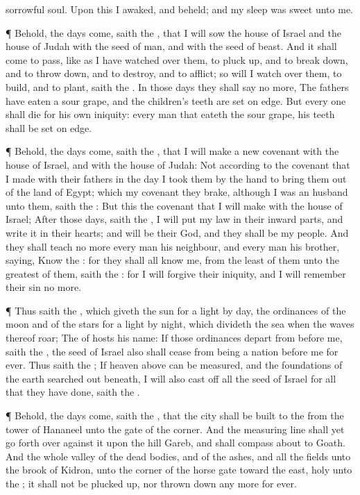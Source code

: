 {sorrowful
soul.
Upon this I
awaked, and
beheld; and my
sleep was
sweet unto me.
\par }{\PP {}¶ Behold, the
days
come,
saith the
{}, that I will
sow the
house of
Israel and the
house of
Judah with the
seed of
man, and with the
seed of
beast.
And it shall come to pass,
{} like as I have watched
over them, to pluck
up, and to break
down, and to throw
down, and to
destroy, and to
afflict; so will I watch
over them, to
build, and to
plant,
saith the
{}.
In those
days they shall
say no more, The
fathers have
eaten a sour
grape, and the
children’s
teeth are set on
edge.
But every
one shall
die for his own
iniquity: every
man that
eateth the sour
grape, his
teeth shall be set on
edge.
\par }{\PP {}¶ Behold, the
days
come,
saith the
{}, that I will
make a
new
covenant with the
house of
Israel, and with the
house of
Judah:
Not according to the
covenant that I
made with their
fathers in the
day
{} I
took them by the
hand to bring them
out of the
land of
Egypt; which my
covenant they
brake, although I was an
husband unto them,
saith the
{}:
But this
{} the
covenant that I will
make with the
house of
Israel;
After those
days,
saith the
{}, I will
put my
law in their inward
parts, and
write it in their
hearts; and will be their
God, and they shall be my
people.
And they shall
teach no more every
man his
neighbour, and every
man his
brother,
saying,
Know the
{}: for they shall all
know me, from the
least of them unto the
greatest of them,
saith the
{}: for I will
forgive their
iniquity, and I will
remember their
sin no more.
\par }{\PP {}¶ Thus
saith the
{}, which
giveth the
sun for a
light by
day,
{} the
ordinances of the
moon and of the
stars for a
light by
night, which
divideth the
sea when the
waves thereof
roar; The
{} of
hosts
{} his
name:
If those
ordinances
depart from
before me,
saith the
{},
{} the
seed of
Israel also shall
cease from being a
nation
before me for
ever.
Thus
saith the
{}; If
heaven
above can be
measured, and the
foundations of the
earth searched
out
beneath, I will also cast
off all the
seed of
Israel for all that they have
done,
saith the
{}.
\par }{\PP {}¶ Behold, the
days
come,
saith the
{}, that the
city shall be
built to the
{} from the
tower of
Hananeel unto the
gate of the
corner.
And the
measuring
line shall yet go
forth over against it upon the
hill
Gareb, and shall compass
about to
Goath.
And the whole
valley of the dead
bodies, and of the
ashes, and all the
fields unto the
brook of
Kidron, unto the
corner of the
horse
gate toward the
east,
{}
holy unto the
{}; it shall not be plucked
up, nor thrown
down any more for
ever.

}
